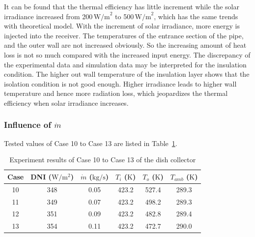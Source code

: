 It can be found that the thermal efficiency has little increment while the solar irradiance increased from 200$\,\mathrm{W/m}^2$ to 500$\,\mathrm{W/m}^2$, which has the same trends with theoretical model. With the increment of solar irradiance, more energy is injected into the receiver. The temperatures of the entrance section of the pipe, and the outer wall are not increased obviously. So the increasing amount of heat loss is not so much compared with the increased input energy. 
The discrepancy of the experimental data and simulation data may be interpreted for the insulation condition. The higher out wall temperature of the insulation layer shows that the isolation condition is not good enough. Higher irradiance leads to higher wall temperature and hence more radiation loss, which jeopardizes the thermal efficiency when solar irradiance increases.


\subsubsection{Influence of $\dot{m}$}

Tested values of Case 10 to Case 13 are listed in Table~\ref{tab:ResultOfDish2}.

\begin{table}[htbp]\footnotesize
	\caption{Experiment results of Case 10 to Case 13 of the dish collector}
	\begin{center}
	\begin{tabular}{cccccc}
		\toprule
		Case	& DNI ($\mathrm{W/m^2}$)	&	$\dot{m}$ ($\mathrm{kg/s}$)			&	$T_i$ ($\mathrm{K}$)	&	$T_o$ ($\mathrm{K}$)		&	$T_{amb}$ ($\mathrm{K}$)\\
		\midrule
		10	&	348	&	0.05	&	423.2	&	527.4	&	289.3\\
		11	&	349	&	0.07	&	423.2	&	498.2	&	289.3\\
		12	&	351	&	0.09	&	423.2	&	482.8	&	289.4	\\
		13	&	354	&	0.11	&	423.2	&	472.7	&	290.0\\
		\bottomrule
	\end{tabular}
	\end{center}
	\label{tab:ResultOfDish2}
\end{table}


